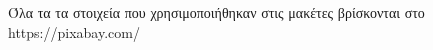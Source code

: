 \documentclass{article}
\begin{document}
\coverpages






\renewcommand*\refname{Βιβλιογραφία}

Όλα τα τα στοιχεία που χρησιμοποιήθηκαν στις μακέτες βρίσκονται στο https://pixabay.com/
\end{document}
